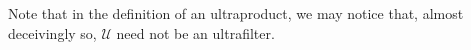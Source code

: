 \documentclass[notoc,notitlepage]{tufte-book}
\begin{document}
\begin{note}
  Note that in the definition of an ultraproduct, we may notice that, almost deceivingly so, $\mathcal{U}$ need not be an ultrafilter.
\end{note}




\appendix

\backmatter\

\pagestyle{plain}



\printindex
\end{document}
